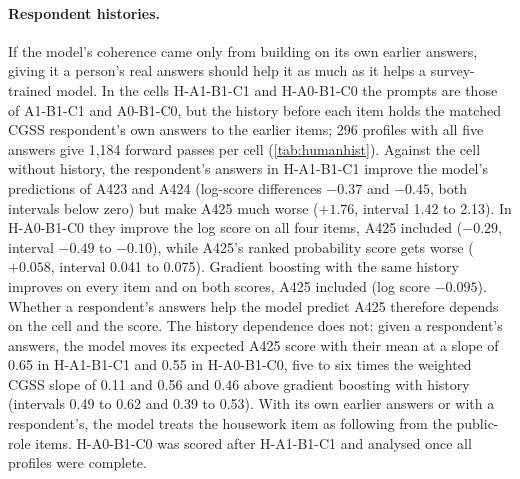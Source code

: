 \documentclass[11pt]{article}
\begin{document}
\paragraph{Respondent histories.} If the model's coherence came only from building on its own earlier answers, giving it a person's real answers should help it as much as it helps a survey-trained model. In the cells H-A1-B1-C1 and H-A0-B1-C0 the prompts are those of A1-B1-C1 and A0-B1-C0, but the history before each item holds the matched CGSS respondent's own answers to the earlier items; 296 profiles with all five answers give 1,184 forward passes per cell (\cref{tab:humanhist}). Against the cell without history, the respondent's answers in H-A1-B1-C1 improve the model's predictions of A423 and A424 (log-score differences $-0.37$ and $-0.45$, both intervals below zero) but make A425 much worse ($+1.76$, interval 1.42 to 2.13). In H-A0-B1-C0 they improve the log score on all four items, A425 included ($-0.29$, interval $-0.49$ to $-0.10$), while A425's ranked probability score gets worse ($+0.058$, interval 0.041 to 0.075). Gradient boosting with the same history improves on every item and on both scores, A425 included (log score $-0.095$). Whether a respondent's answers help the model predict A425 therefore depends on the cell and the score. The history dependence does not: given a respondent's answers, the model moves its expected A425 score with their mean at a slope of 0.65 in H-A1-B1-C1 and 0.55 in H-A0-B1-C0, five to six times the weighted CGSS slope of 0.11 and 0.56 and 0.46 above gradient boosting with history (intervals 0.49 to 0.62 and 0.39 to 0.53). With its own earlier answers or with a respondent's, the model treats the housework item as following from the public-role items. H-A0-B1-C0 was scored after H-A1-B1-C1 and analysed once all profiles were complete.
\end{document}
